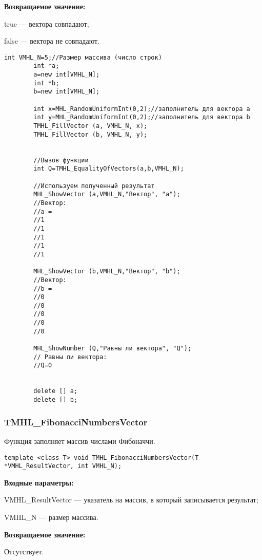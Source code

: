 \documentclass[a4paper,12pt]{article}
\begin{document}
\textbf{Возвращаемое значение:}

 true --- вектора совпадают;
 
 false --- вектора не совпадают.


\begin{lstlisting}[label=code_use_TMHL_EqualityOfVectors,caption=Пример использования]
        int VMHL_N=5;//Размер массива (число строк)
        int *a;
        a=new int[VMHL_N];
        int *b;
        b=new int[VMHL_N];

        int x=MHL_RandomUniformInt(0,2);//заполнитель для вектора a
        int y=MHL_RandomUniformInt(0,2);//заполнитель для вектора b
        TMHL_FillVector (a, VMHL_N, x);
        TMHL_FillVector (b, VMHL_N, y);


        //Вызов функции
        int Q=TMHL_EqualityOfVectors(a,b,VMHL_N);

        //Используем полученный результат
        MHL_ShowVector (a,VMHL_N,"Вектор", "a");
        //Вектор:
        //a =
        //1
        //1
        //1
        //1
        //1

        MHL_ShowVector (b,VMHL_N,"Вектор", "b");
        //Вектор:
        //b =
        //0
        //0
        //0
        //0
        //0

        MHL_ShowNumber (Q,"Равны ли вектора", "Q");
        // Равны ли вектора:
        //Q=0


        delete [] a;
        delete [] b;
\end{lstlisting}

\subsubsection{TMHL\_FibonacciNumbersVector}\label{TMHL_FibonacciNumbersVector}

Функция заполняет массив числами Фибоначчи.


\begin{lstlisting}[label=code_syntax_TMHL_FibonacciNumbersVector,caption=Синтаксис]
template <class T> void TMHL_FibonacciNumbersVector(T *VMHL_ResultVector, int VMHL_N);
\end{lstlisting}

\textbf{Входные параметры:}

 VMHL\_ResultVector --- указатель на массив, в который записывается результат;
 
 VMHL\_N --- размер массива.

\textbf{Возвращаемое значение:}

Отсутствует.
\end{document}
